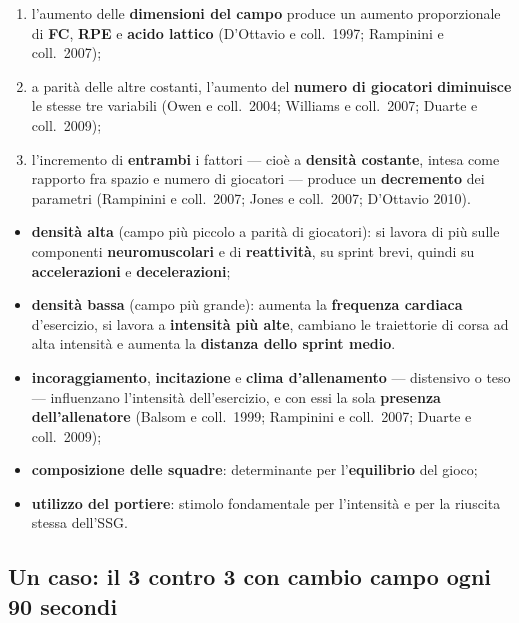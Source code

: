 \begin{enumerate}
  \item l'aumento delle \textbf{dimensioni del campo} produce un aumento proporzionale di
    \textbf{FC}, \textbf{RPE} e \textbf{acido lattico} (D'Ottavio e coll.\ 1997; Rampinini e coll.\
    2007);
  \item a parità delle altre costanti, l'aumento del \textbf{numero di giocatori}
    \textbf{diminuisce} le stesse tre variabili (Owen e coll.\ 2004; Williams e coll.\ 2007; Duarte
    e coll.\ 2009);
  \item l'incremento di \textbf{entrambi} i fattori --- cioè a \textbf{densità costante}, intesa
    come rapporto fra spazio e numero di giocatori --- produce un \textbf{decremento} dei parametri
    (Rampinini e coll.\ 2007; Jones e coll.\ 2007; D'Ottavio 2010).
\end{enumerate}

\begin{itemize}
  \item \textbf{densità alta} (campo più piccolo a parità di giocatori): si lavora di più sulle
    componenti \textbf{neuromuscolari} e di \textbf{reattività}, su sprint brevi, quindi su
    \textbf{accelerazioni} e \textbf{decelerazioni};
  \item \textbf{densità bassa} (campo più grande): aumenta la \textbf{frequenza cardiaca}
    d'esercizio, si lavora a \textbf{intensità più alte}, cambiano le traiettorie di corsa ad alta
    intensità e aumenta la \textbf{distanza dello sprint medio}.
\end{itemize}

\begin{itemize}
  \item \textbf{incoraggiamento}, \textbf{incitazione} e \textbf{clima d'allenamento} --- distensivo
    o teso --- influenzano l'intensità dell'esercizio, e con essi la sola \textbf{presenza
    dell'allenatore} (Balsom e coll.\ 1999; Rampinini e coll.\ 2007; Duarte e coll.\ 2009);
  \item \textbf{composizione delle squadre}: determinante per l'\textbf{equilibrio} del gioco;
  \item \textbf{utilizzo del portiere}: stimolo fondamentale per l'intensità e per la riuscita
    stessa dell'SSG.
\end{itemize}

\subsection{Un caso: il 3 contro 3 con cambio campo ogni 90 secondi}

